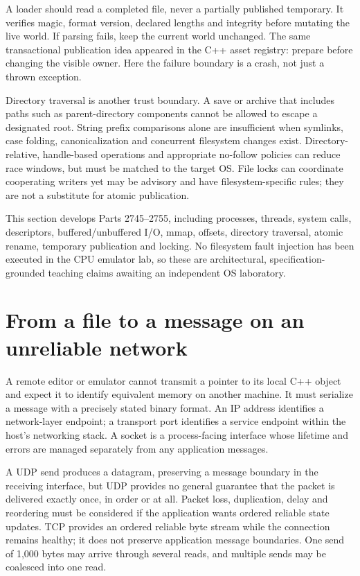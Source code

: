 A loader should read a completed file, never a partially published temporary. It verifies magic, format version, declared lengths and integrity before mutating the live world. If parsing fails, keep the current world unchanged. The same transactional publication idea appeared in the C++ asset registry: prepare before changing the visible owner. Here the failure boundary is a crash, not just a thrown exception.

Directory traversal is another trust boundary. A save or archive that includes paths such as parent-directory components cannot be allowed to escape a designated root. String prefix comparisons alone are insufficient when symlinks, case folding, canonicalization and concurrent filesystem changes exist. Directory-relative, handle-based operations and appropriate no-follow policies can reduce race windows, but must be matched to the target OS. File locks can coordinate cooperating writers yet may be advisory and have filesystem-specific rules; they are not a substitute for atomic publication.

This section develops Parts 2745--2755, including processes, threads, system calls, descriptors, buffered/unbuffered I/O, mmap, offsets, directory traversal, atomic rename, temporary publication and locking. No filesystem fault injection has been executed in the CPU emulator lab, so these are architectural, specification-grounded teaching claims awaiting an independent OS laboratory.

\section{From a file to a message on an unreliable network}\label{06-engine-ii-ch042-from-a-file-to-a-message-on-an-unreliable-network}

A remote editor or emulator cannot transmit a pointer to its local C++ object and expect it to identify equivalent memory on another machine. It must serialize a message with a precisely stated binary format. An IP address identifies a network-layer endpoint; a transport port identifies a service endpoint within the host's networking stack. A socket is a process-facing interface whose lifetime and errors are managed separately from any application messages.

A UDP send produces a datagram, preserving a message boundary in the receiving interface, but UDP provides no general guarantee that the packet is delivered exactly once, in order or at all. Packet loss, duplication, delay and reordering must be considered if the application wants ordered reliable state updates. TCP provides an ordered reliable byte stream while the connection remains healthy; it does not preserve application message boundaries. One send of 1,000 bytes may arrive through several reads, and multiple sends may be coalesced into one read.

